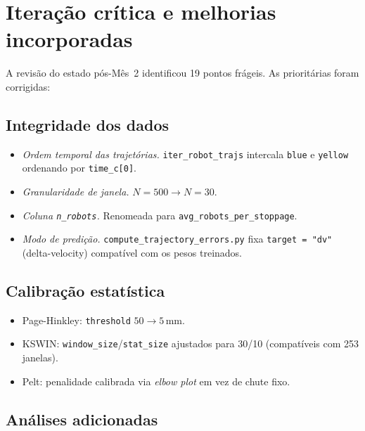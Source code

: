 \documentclass[11pt,a4paper]{article}
\begin{document}
\section{Itera\c{c}\~ao cr\'itica e melhorias incorporadas}

A revis\~ao do estado p\'os-M\^es~2 identificou 19 pontos fr\'ageis. As
priorit\'arias foram corrigidas:

\subsection{Integridade dos dados}

\begin{itemize}[leftmargin=1.4em,itemsep=2pt]
    \item \emph{Ordem temporal das trajet\'orias.} \texttt{iter\_robot\_trajs}
          intercala \texttt{blue} e \texttt{yellow} ordenando por
          \texttt{time\_c[0]}.
    \item \emph{Granularidade de janela.} $N{=}500\to N{=}30$.
    \item \emph{Coluna \texttt{n\_robots}.} Renomeada para
          \texttt{avg\_robots\_per\_stoppage}.
    \item \emph{Modo de predi\c{c}\~ao.}
          \texttt{compute\_trajectory\_errors.py} fixa
          \texttt{target = "dv"} (delta-velocity) compat\'ivel com os
          pesos treinados.
\end{itemize}

\subsection{Calibra\c{c}\~ao estat\'istica}

\begin{itemize}[leftmargin=1.4em,itemsep=2pt]
    \item Page-Hinkley: \texttt{threshold} $50 \to 5$\,mm.
    \item KSWIN: \texttt{window\_size}/\texttt{stat\_size} ajustados
          para 30/10 (compat\'iveis com 253 janelas).
    \item Pelt: penalidade calibrada via \emph{elbow plot} em vez de
          chute fixo.
\end{itemize}

\subsection{An\'alises adicionadas}
\end{document}
